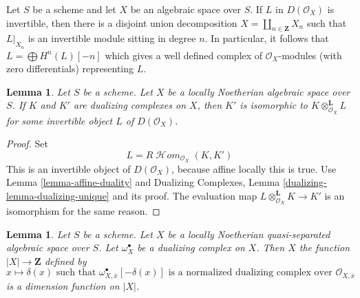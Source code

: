 \documentclass{stacks-project}
\theoremstyle{plain}
\newtheorem{lemma}[subsection]{Lemma}
\theoremstyle{definition}
\theoremstyle{remark}
\numberwithin{equation}{subsection}
\def\SheafHom{\mathop{\mathcal{H}\!\mathit{om}}\nolimits}
\begin{document}
\medskip\noindent
Let $S$ be a scheme and let $X$ be an algebraic space over $S$.
If $L$ in $D(\mathcal{O}_X)$ is invertible, then there is a
disjoint union decomposition $X = \coprod_{n \in \mathbf{Z}} X_n$
such that $L|_{X_n}$ is an invertible module sitting in degree $n$.
In particular, it follows that $L = \bigoplus H^n(L)[-n]$
which gives a well defined complex of $\mathcal{O}_X$-modules
(with zero differentials) representing $L$.

\begin{lemma}
\label{lemma-dualizing-unique-spaces}
Let $S$ be a scheme.
Let $X$ be a locally Noetherian algebraic space over $S$.
If $K$ and $K'$ are dualizing complexes on $X$, then $K'$
is isomorphic to $K \otimes_{\mathcal{O}_X}^\mathbf{L} L$
for some invertible object $L$ of $D(\mathcal{O}_X)$.
\end{lemma}

\begin{proof}
Set
$$
L = R\SheafHom_{\mathcal{O}_X}(K, K')
$$
This is an invertible object of $D(\mathcal{O}_X)$, because affine locally
this is true. Use Lemma \ref{lemma-affine-duality} and
Dualizing Complexes, Lemma
\ref{dualizing-lemma-dualizing-unique} and its proof.
The evaluation map $L \otimes_{\mathcal{O}_X}^\mathbf{L} K \to K'$
is an isomorphism for the same reason.
\end{proof}

\begin{lemma}
\label{lemma-dimension-function-scheme}
Let $S$ be a scheme. Let $X$ be a locally Noetherian
quasi-separated algebraic space over $S$.
Let $\omega_X^\bullet$ be a dualizing complex on $X$. Then $X$ the function
$|X| \to \mathbf{Z}$ defined by
$$
x \longmapsto \delta(x)\text{ such that }
\omega_{X, \overline{x}}^\bullet[-\delta(x)]
\text{ is a normalized dualizing complex over }
\mathcal{O}_{X, \overline{x}}
$$
is a dimension function on $|X|$.
\end{lemma}
\end{document}
